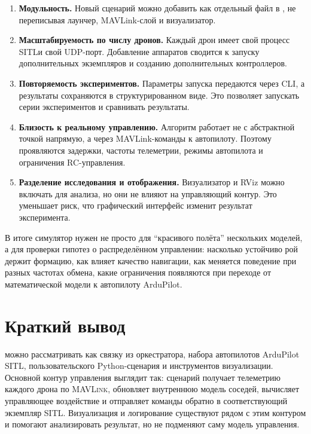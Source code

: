 \documentclass[a4paper,11pt]{article}
\newcommand{\code}[1]{\texttt{\detokenize{#1}}}
\newcommand{\MAVLink}{\textsc{MAVLink}}
\newcommand{\SITL}{\textsc{SITL}}
\begin{document}
\begin{enumerate}
  \item \textbf{Модульность.} Новый сценарий можно добавить как отдельный
  файл в \code{scenarios/}, не переписывая лаунчер, MAVLink-слой и
  визуализатор.

  \item \textbf{Масштабируемость по числу дронов.} Каждый дрон имеет свой
  процесс \SITL и свой UDP-порт. Добавление аппаратов сводится к запуску
  дополнительных экземпляров и созданию дополнительных контроллеров.

  \item \textbf{Повторяемость экспериментов.} Параметры запуска передаются
  через CLI, а результаты сохраняются в структурированном виде. Это позволяет
  запускать серии экспериментов и сравнивать результаты.

  \item \textbf{Близость к реальному управлению.} Алгоритм работает не с
  абстрактной точкой напрямую, а через MAVLink-команды к автопилоту. Поэтому
  проявляются задержки, частоты телеметрии, режимы автопилота и ограничения
  RC-управления.

  \item \textbf{Разделение исследования и отображения.} Визуализатор и RViz
  можно включать для анализа, но они не влияют на управляющий контур. Это
  уменьшает риск, что графический интерфейс изменит результат эксперимента.
\end{enumerate}

В итоге симулятор нужен не просто для ``красивого полёта'' нескольких моделей,
а для проверки гипотез о распределённом управлении: насколько устойчиво рой
держит формацию, как влияет качество навигации, как меняется поведение при
разных частотах обмена, какие ограничения появляются при переходе от
математической модели к автопилоту ArduPilot.

\section{Краткий вывод}

\code{Drone\_Swarm\_Simulator\_v2} можно рассматривать как связку из
оркестратора, набора автопилотов ArduPilot \SITL, пользовательского
Python-сценария и инструментов визуализации. Основной контур управления
выглядит так: сценарий получает телеметрию каждого дрона по \MAVLink,
обновляет внутреннюю модель соседей, вычисляет управляющее воздействие и
отправляет команды обратно в соответствующий экземпляр \SITL. Визуализация и
логирование существуют рядом с этим контуром и помогают анализировать
результат, но не подменяют саму модель управления.
\end{document}
